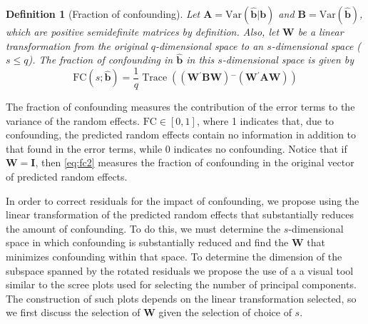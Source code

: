 \documentclass[12pt]{article} %
\newcommand{\al}[1]{{\color{red} #1}}
\newtheorem{definition}{Definition}
\newcommand{\ginv}{\ensuremath{^{-}}}
\newcommand{\trans}{\ensuremath{^\prime}}
\newcommand{\var}{\ensuremath{\mathrm{Var}}}
\DeclareMathOperator{\tr}{Trace}
\begin{document}
\begin{definition}[Fraction of confounding]
Let $\bm{A} = \var(\widehat{\bm{b}} | \bm{b} )$ and $\bm{B} = \var(\widehat{\bm{b}})$, which are positive semidefinite matrices by definition. \al{Also, let $\bm{W}$ be a linear transformation from the original $q$-dimensional space to an $s$-dimensional space ($s \leq q$).} The fraction of confounding in $\widehat{\bm{b}}$ \al{in this $s$-dimensional space} is given by
%
\begin{equation}\label{eq:fc2}
\text{FC}(s; \widehat{\bm{b}}) = \frac{1}{q} \tr\left( \left(\bm{W\trans B W} \right)\ginv \left(\bm{W\trans A W}\right) \right)
\end{equation}
\end{definition}
The fraction of confounding measures the contribution of the error terms  to the variance of the random effects. $\text{FC} \in [0,1]$, where 1 indicates that, due to confounding, the predicted random effects contain no information in addition to that found in the error terms, while 0 indicates no confounding. \al{Notice that if $\bm{W} = \bm{I}$, then \eqref{eq:fc2} measures the fraction of confounding in the original vector of predicted random effects.}


In order to correct residuals for the impact of confounding, we propose \al{using the linear transformation of the predicted random effects that substantially reduces the amount of confounding. To do this, we must determine the $s$-dimensional space in which confounding is substantially reduced and find the $\bm{W}$ that minimizes confounding within that space. To determine the dimension of the subspace spanned by the rotated residuals we propose the use of a a visual tool similar to the scree plots used for selecting the number of principal components. The construction of such plots depends on the linear transformation selected, so we first discuss the selection of $\bm{W}$ given the selection of choice of $s$.}
\end{document}
